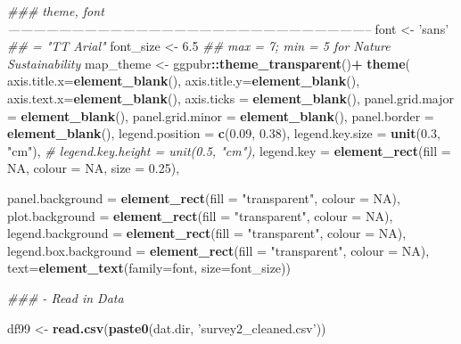 \documentclass[
]{article}
\newenvironment{Shaded}{\begin{snugshade}}{\end{snugshade}}
\newcommand{\CommentTok}[1]{\textcolor[rgb]{0.56,0.35,0.01}{\textit{#1}}}
\newcommand{\DataTypeTok}[1]{\textcolor[rgb]{0.13,0.29,0.53}{#1}}
\newcommand{\FloatTok}[1]{\textcolor[rgb]{0.00,0.00,0.81}{#1}}
\newcommand{\KeywordTok}[1]{\textcolor[rgb]{0.13,0.29,0.53}{\textbf{#1}}}
\newcommand{\NormalTok}[1]{#1}
\newcommand{\OperatorTok}[1]{\textcolor[rgb]{0.81,0.36,0.00}{\textbf{#1}}}
\newcommand{\OtherTok}[1]{\textcolor[rgb]{0.56,0.35,0.01}{#1}}
\newcommand{\StringTok}[1]{\textcolor[rgb]{0.31,0.60,0.02}{#1}}
\begin{document}
\begin{Shaded}
\begin{Highlighting}[]
{{{{{{\CommentTok{### theme, font --------------------------------------------------------------------------------------}
\NormalTok{font      <-}\StringTok{ 'sans'} \CommentTok{## = "TT Arial"}
\NormalTok{font_size <-}\StringTok{ }\FloatTok{6.5} \CommentTok{## max = 7; min = 5 for Nature Sustainability}
\NormalTok{map_theme <-}\StringTok{ }\NormalTok{ggpubr}\OperatorTok{::}\KeywordTok{theme_transparent}\NormalTok{()}\OperatorTok{+}
\StringTok{  }\KeywordTok{theme}\NormalTok{(}
    \DataTypeTok{axis.title.x=}\KeywordTok{element_blank}\NormalTok{(),}
    \DataTypeTok{axis.title.y=}\KeywordTok{element_blank}\NormalTok{(),}
    \DataTypeTok{axis.text.x=}\KeywordTok{element_blank}\NormalTok{(),}
    \DataTypeTok{axis.ticks =} \KeywordTok{element_blank}\NormalTok{(),}
    \DataTypeTok{panel.grid.major =} \KeywordTok{element_blank}\NormalTok{(),}
    \DataTypeTok{panel.grid.minor =} \KeywordTok{element_blank}\NormalTok{(),}
    \DataTypeTok{panel.border =} \KeywordTok{element_blank}\NormalTok{(),}
    \DataTypeTok{legend.position =} \KeywordTok{c}\NormalTok{(}\FloatTok{0.09}\NormalTok{, }\FloatTok{0.38}\NormalTok{),}
    \DataTypeTok{legend.key.size =} \KeywordTok{unit}\NormalTok{(}\FloatTok{0.3}\NormalTok{, }\StringTok{"cm"}\NormalTok{),}
    \CommentTok{# legend.key.height = unit(0.5, "cm"),}
    \DataTypeTok{legend.key =} \KeywordTok{element_rect}\NormalTok{(}\DataTypeTok{fill =} \OtherTok{NA}\NormalTok{, }\DataTypeTok{colour =} \OtherTok{NA}\NormalTok{, }\DataTypeTok{size =} \FloatTok{0.25}\NormalTok{),}
    
    \DataTypeTok{panel.background =} \KeywordTok{element_rect}\NormalTok{(}\DataTypeTok{fill =} \StringTok{"transparent"}\NormalTok{, }\DataTypeTok{colour =} \OtherTok{NA}\NormalTok{),}
    \DataTypeTok{plot.background =} \KeywordTok{element_rect}\NormalTok{(}\DataTypeTok{fill =} \StringTok{"transparent"}\NormalTok{, }\DataTypeTok{colour =} \OtherTok{NA}\NormalTok{),}
    \DataTypeTok{legend.background =} \KeywordTok{element_rect}\NormalTok{(}\DataTypeTok{fill =} \StringTok{"transparent"}\NormalTok{, }\DataTypeTok{colour =} \OtherTok{NA}\NormalTok{),}
    \DataTypeTok{legend.box.background =} \KeywordTok{element_rect}\NormalTok{(}\DataTypeTok{fill =} \StringTok{"transparent"}\NormalTok{, }\DataTypeTok{colour =} \OtherTok{NA}\NormalTok{),}
    \DataTypeTok{text=}\KeywordTok{element_text}\NormalTok{(}\DataTypeTok{family=}\NormalTok{font, }\DataTypeTok{size=}\NormalTok{font_size))}


\CommentTok{### - Read in Data}

\NormalTok{df99 <-}\StringTok{ }\KeywordTok{read.csv}\NormalTok{(}\KeywordTok{paste0}\NormalTok{(dat.dir, }\StringTok{'survey2_cleaned.csv'}\NormalTok{))}


}}}}}}
\end{Highlighting}
\end{Shaded}
\end{document}
